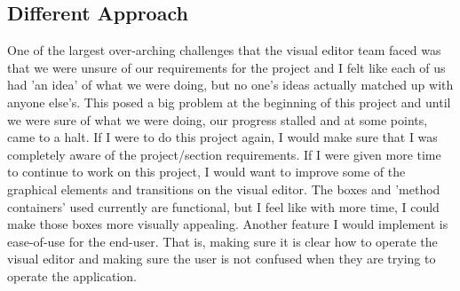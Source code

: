 \documentclass[a4paper]{article}
\begin{document}
\subsection{Different Approach}

One of the largest over-arching challenges that the visual editor team faced was that we were unsure of our requirements for the project and I felt like each of us had 'an idea' of what we were doing, but no one's ideas actually matched up with anyone else's. This posed a big problem at the beginning of this project and until we were sure of what we were doing, our progress stalled and at some points, came to a halt. If I were to do this project again, I would make sure that I was completely aware of the project/section requirements. If I were given more time to continue to work on this project, I would want to improve some of the graphical elements and transitions on the visual editor. The boxes and 'method containers' used currently are functional, but I feel like with more time, I could make those boxes more visually appealing. Another feature I would implement is ease-of-use for the end-user. That is, making sure it is clear how to operate the visual editor and making sure the user is not confused when they are trying to operate the application.
\end{document}
